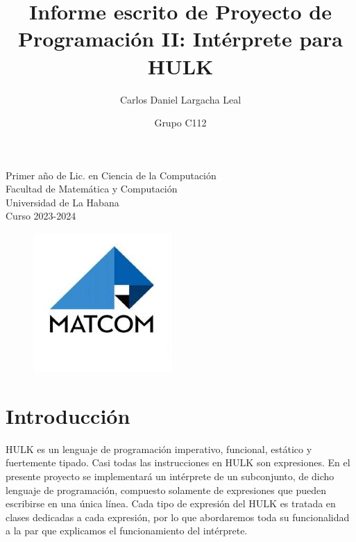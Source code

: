 \documentclass{article}
\begin{document}
\title{\textbf{Informe escrito de Proyecto de Programación II: Intérprete para HULK} }
\author{Carlos Daniel Largacha Leal}
\date{Grupo C112}

\thispagestyle{empty} 
\maketitle

\vspace{4cm}
\begin{center}
	Primer año de Lic. en Ciencia de la Computación \\ Facultad de Matemática y Computación \\ Universidad de La Habana \\ Curso 2023-2024
\end{center}

\begin{figure}[h]
	\centering
	\includegraphics[scale= 0.53]{R.jpg}
\end{figure}

\vspace{10pt}

\newpage

\tableofcontents
\newpage

\section{Introducción}

HULK es un lenguaje de programación imperativo, funcional, estático y fuertemente tipado. Casi todas las instrucciones en HULK son expresiones. En el presente 
proyecto se implementará un intérprete de un subconjunto, de dicho lenguaje de programación,  compuesto solamente de expresiones que pueden escribirse en una 
única línea. Cada tipo de expresión del HULK es tratada en clases dedicadas a cada expresión, por lo que abordaremos toda su funcionalidad a la par que explicamos el funcionamiento del 
intérprete.
\end{document}
